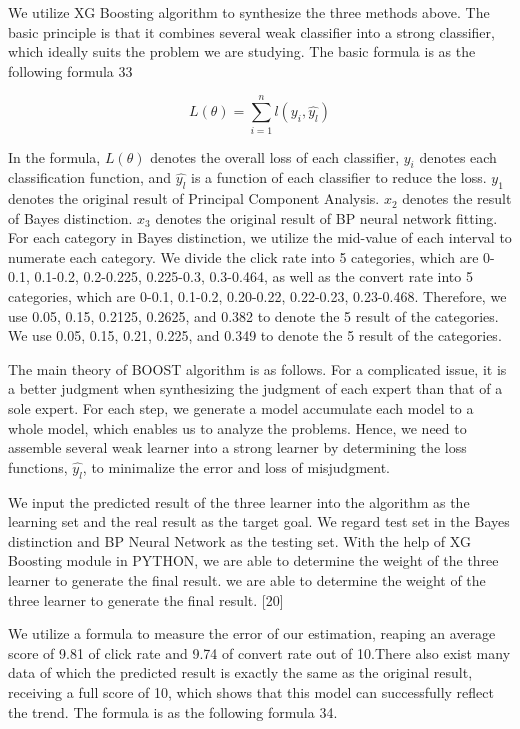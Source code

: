 We utilize XG Boosting algorithm to synthesize the three methods above. The basic principle is that it combines several weak classifier into a strong classifier, which ideally suits the problem we are studying. The basic formula is as the following formula 33

\begin{equation}
L ( \theta ) = \sum _ { i = 1 } ^ { n } l \left( y _ { i } , \widehat { y _ { l } } \right)
\end{equation}

In the formula, $L ( \theta )$ denotes the overall loss of each classifier, $y _ { i }$ denotes each classification function, and $\widehat { y _ { l } }$ is a function of each classifier to reduce the loss. $y _ { 1 }$ denotes the original result of Principal Component Analysis. $x _ { 2 }$ denotes the result of Bayes distinction. $x _ { 3 }$ denotes the original result of BP neural network fitting. For each category in Bayes distinction, we utilize the mid-value of each interval to numerate each category. We divide the click rate into 5 categories, which are 0-0.1, 0.1-0.2, 0.2-0.225, 0.225-0.3, 0.3-0.464, as well as the convert rate into 5 categories, which are 0-0.1, 0.1-0.2, 0.20-0.22, 0.22-0.23, 0.23-0.468. Therefore, we use 0.05, 0.15, 0.2125, 0.2625, and 0.382 to denote the 5 result of the categories. We use 0.05, 0.15, 0.21, 0.225, and 0.349 to denote the 5 result of the categories. 

The main theory of BOOST algorithm is as follows. For a complicated issue, it is a better judgment when synthesizing the judgment of each expert than that of a sole expert. For each step, we generate a model accumulate each model to a whole model, which enables us to analyze the problems. Hence, we need to assemble several weak learner into a strong learner by determining the loss functions, $\widehat { y _ { l } }$, to minimalize the error and loss of misjudgment. 

We input the predicted result of the three learner into the algorithm as the learning set and the real result as the target goal. We regard test set in the Bayes distinction and BP Neural Network as the testing set. With the help of XG Boosting module in PYTHON, we are able to determine the weight of the three learner to generate the final result. we are able to determine the weight of the three learner to generate the final result. [20]

We utilize a formula to measure the error of our estimation, reaping an average score of 9.81 of click rate and 9.74 of convert rate out of 10.There also exist many data of which the predicted result is exactly the same as the original result, receiving a full score of 10, which shows that this model can successfully reflect the trend. The formula is as the following formula 34. 

